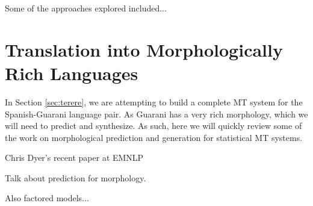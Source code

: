 Some of the approaches explored included...


\section{Translation into Morphologically Rich Languages}
In Section \ref{sec:terere}, we are attempting to build a complete MT system
for the Spanish-Guarani language pair. As Guarani has a very rich morphology,
which we will need to predict and synthesize. As such, here we will quickly
review some of the work on morphological prediction and generation for
statistical MT systems.

Chris Dyer's recent paper at EMNLP
\cite{chahuneau:2013:emnlp}

Talk about prediction for morphology.
\cite{toutanova-suzuki-ruopp:2008:ACLMain}

Also factored models...
\cite{yeniterzi-oflazer:2010:ACL}
